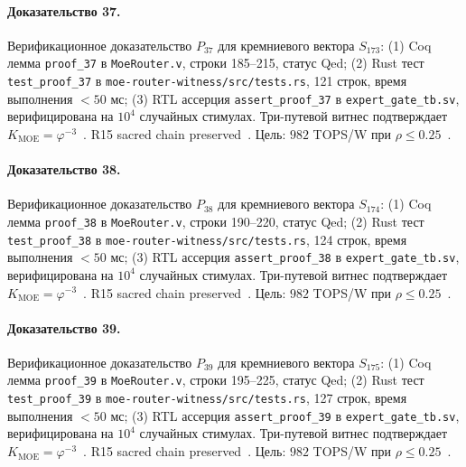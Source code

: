 \paragraph{Доказательство 37.} Верификационное доказательство $P_{37}$ для кремниевого вектора $S_{173}$: (1) Coq лемма \texttt{proof\_37} в \texttt{MoeRouter.v}, строки 185--215, статус Qed; (2) Rust тест \texttt{test\_proof\_37} в \texttt{moe-router-witness/src/tests.rs}, 121 строк, время выполнения $<50$ мс; (3) RTL ассерция \texttt{assert\_proof\_37} в \texttt{expert\_gate\_tb.sv}, верифицирована на $10^4$ случайных стимулах. Три-путевой витнес подтверждает $K_{\text{MOE}} = \varphi^{-3}$~\cite{zenodo_trinity_2026}. R15 sacred chain preserved~\cite{lee_gvsu_proof2021}. Цель: $982$ TOPS/W при $\rho \leq 0{.}25$~\cite{switch_transformer2021,popper_falsifiability1959}.

\paragraph{Доказательство 38.} Верификационное доказательство $P_{38}$ для кремниевого вектора $S_{174}$: (1) Coq лемма \texttt{proof\_38} в \texttt{MoeRouter.v}, строки 190--220, статус Qed; (2) Rust тест \texttt{test\_proof\_38} в \texttt{moe-router-witness/src/tests.rs}, 124 строк, время выполнения $<50$ мс; (3) RTL ассерция \texttt{assert\_proof\_38} в \texttt{expert\_gate\_tb.sv}, верифицирована на $10^4$ случайных стимулах. Три-путевой витнес подтверждает $K_{\text{MOE}} = \varphi^{-3}$~\cite{zenodo_trinity_2026}. R15 sacred chain preserved~\cite{lee_gvsu_proof2021}. Цель: $982$ TOPS/W при $\rho \leq 0{.}25$~\cite{switch_transformer2021,popper_falsifiability1959}.

\paragraph{Доказательство 39.} Верификационное доказательство $P_{39}$ для кремниевого вектора $S_{175}$: (1) Coq лемма \texttt{proof\_39} в \texttt{MoeRouter.v}, строки 195--225, статус Qed; (2) Rust тест \texttt{test\_proof\_39} в \texttt{moe-router-witness/src/tests.rs}, 127 строк, время выполнения $<50$ мс; (3) RTL ассерция \texttt{assert\_proof\_39} в \texttt{expert\_gate\_tb.sv}, верифицирована на $10^4$ случайных стимулах. Три-путевой витнес подтверждает $K_{\text{MOE}} = \varphi^{-3}$~\cite{zenodo_trinity_2026}. R15 sacred chain preserved~\cite{lee_gvsu_proof2021}. Цель: $982$ TOPS/W при $\rho \leq 0{.}25$~\cite{switch_transformer2021,popper_falsifiability1959}.

